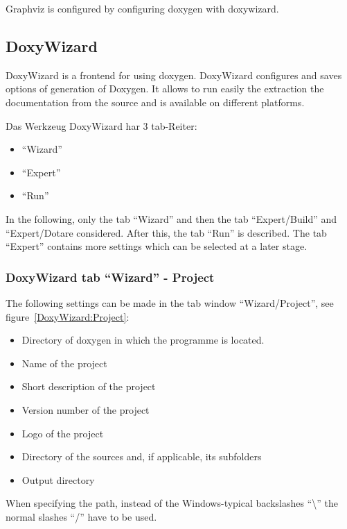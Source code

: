 Graphviz is configured by configuring doxygen with doxywizard.


\subsection{DoxyWizard}

DoxyWizard is a frontend for using doxygen. DoxyWizard configures and saves options of generation of Doxygen. It allows to run easily the extraction the documentation from the source and  is available on different platforms.

\bigskip

Das Werkzeug DoxyWizard har 3 tab-Reiter: 

\begin{itemize}
  \item ``Wizard''
  \item ``Expert''
  \item ``Run''
\end{itemize}

In the following, only the tab ``Wizard'' and then the tab ``Expert/Build'' and ``Expert/Dotare considered. After this, the tab ``Run'' is described.  The tab ``Expert'' contains more settings which can be selected at a later stage.

\subsubsection{DoxyWizard tab ``Wizard'' - Project}

The following settings can be made in the tab window ``Wizard/Project'', see figure~\ref{DoxyWizard:Project}:

\begin{itemize}
	\item Directory of doxygen in which the programme  is located.
	\item Name of the project
	\item Short description of the project
	\item Version number of the project
	\item Logo of the project
	\item Directory of the sources and, if applicable, its subfolders
	\item Output directory
\end{itemize}

 When specifying the path, instead of the  Windows-typical backslashes ``\textbackslash'' the normal slashes ``/'' have to be used.


